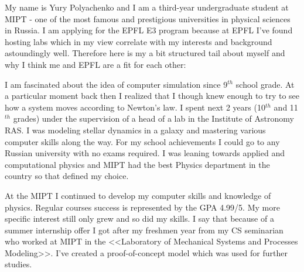 \documentclass[11pt, a4paper]{awesome-cv}
\begin{document}
\begin{cvletter}


\hspace{10pt} My name is Yury Polyachenko and I am a third-year undergraduate student at MIPT - one of the most famous and prestigious universities in physical sciences in Russia. I am applying for the EPFL E3 program because at EPFL I've found hosting labs which in my view correlate with my interests and background astoundingly well. Therefore here is my a bit structured tail about myself and why I think me and EPFL are a fit for each other:

I am fascinated about the idea of computer simulation since 9$^{th}$ school grade. At a particular moment back then I realized that I though knew enough to try to see how a system moves according to Newton's law. I spent next 2 years (10$^{th}$ and 11$^{th}$ grades) under the supervision of a head of a lab in the Institute of Astronomy RAS. I was modeling stellar dynamics in a galaxy and mastering various computer skills along the way. For my school achievements I could go to any Russian university with no exams required. I was leaning towards applied and computational physics and MIPT had the best Physics department in the country so that defined my choice. 

At the MIPT I continued to develop my computer skills and knowledge of physics. Regular courses success is represented by the GPA 4.99/5. My more specific interest still only grew and so did my skills. I say that because of a summer internship offer I got after my freshmen year from my CS seminarian who worked at MIPT in the <<Laboratory of Mechanical Systems and Processes Modeling>>. I've created a proof-of-concept model which was used for further studies. 


\end{cvletter}
\end{document}
